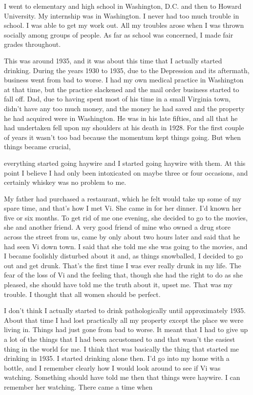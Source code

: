 \begin{biblechapter}
I went to elementary and high school in Washington, D.C. and then to Howard University. My internship was in Washington. I never had too much trouble in school. I was able to get my work out. All my troubles arose when I was thrown socially among groups of people. As far as school was concerned, I made fair grades throughout.

This was around 1935, and it was about this time that I actually started drinking. During the years 1930 to 1935, due to the Depression and its aftermath, business went from bad to worse. I had my own medical practice in Washington at that time, but the practice slackened and the mail order business started to fall off. Dad, due to having spent most of his time in a small Virginia town, didn’t have any too much money, and the money he had saved and the property he had acquired were in Washington. He was in his late fifties, and all that he had undertaken fell upon my shoulders at his death in 1928. For the first couple of years it wasn’t too bad because the momentum kept things going. But when things became crucial,

everything started going haywire and I started going haywire with them. At this point I believe I had only been intoxicated on maybe three or four occasions, and certainly whiskey was no problem to me.

My father had purchased a restaurant, which he felt would take up some of my spare time, and that’s how I met Vi. She came in for her dinner. I’d known her five or six months. To get rid of me one evening, she decided to go to the movies, she and another friend. A very good friend of mine who owned a drug store across the street from us, came by only about two hours later and said that he had seen Vi down town. I said that she told me she was going to the movies, and I became foolishly disturbed about it and, as things snowballed, I decided to go out and get drunk. That’s the first time I was ever really drunk in my life. The fear of the loss of Vi and the feeling that, though she had the right to do as she pleased, she should have told me the truth about it, upset me. That was my trouble. I thought that all women should be perfect.

I don’t think I actually started to drink pathologically until approximately 1935. About that time I had lost practically all my property except the place we were living in. Things had just gone from bad to worse. It meant that I had to give up a lot of the things that I had been accustomed to and that wasn’t the easiest thing in the world for me. I think that was basically the thing that started me drinking in 1935. I started drinking alone then. I’d go into my home with a bottle, and I remember clearly how I would look around to see if Vi was watching. Something should have told me then that things were haywire. I can remember her watching. There came a time when


\end{biblechapter}
